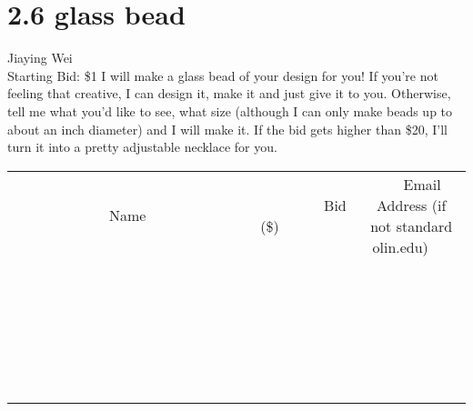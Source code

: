 \documentclass[11pt]{article}
\begin{document}
\section*{2.6 glass bead}
Jiaying Wei
\\
Starting Bid: \$1
\newline
I will make a glass bead of your design for you! If you're not feeling that creative, I can design it, make it and just give it to you. Otherwise, tell me what you'd like to see, what size (although I can only make beads up to about an inch diameter) and I will make it. If the bid gets higher than \$20, I'll turn it into a pretty adjustable necklace for you.
\\[6ex]
\begin{tabular}{c c c}
~~~~~~~~~~~~~Name~~~~~~~~~~~~~ & ~~~~~~~~~Bid (\$)~~~~~~~~~  & ~~~Email Address (if not standard olin.edu)~~~\\
 & & \\
\hline
 & & \\
\hline
 & & \\
\hline
 & & \\
\hline
 & & \\
\hline
 & & \\
\hline
 & & \\
\hline
 & & \\
\hline
 & & \\
\hline
 & & \\
\hline
 & & \\
\hline
 & & \\
\hline
 & & \\
\hline
 & & \\
\hline
 & & \\
\hline
 & & \\
\hline
 & & \\
\hline
 & & \\
\hline
 & & \\
\hline
 & & \\
\hline
 & & \\
\hline
 & & \\
\hline
 & & \\
\hline
 & & \\
\hline
 & & \\
\hline
 & & \\
\hline
\end{tabular}
\newpage
\end{document}
